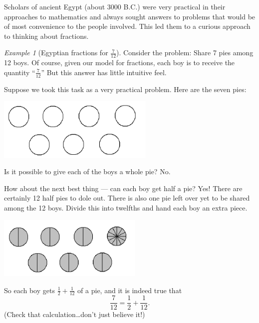 \documentclass[10pt, reqno]{amsart}
\theoremstyle{remark}
\newtheorem{example}[thm]{Example}
\theoremstyle{definition}
\numberwithin{equation}{section}  %
\begin{document}
Scholars of ancient Egypt (about 3000 B.C.) were very practical in their approaches to
mathematics and always sought answers to problems that would be of most
convenience to the people involved. This led them to a curious approach to thinking
about fractions.

\begin{example}[Egyptian fractions for $\frac 7{12}$]
Consider the problem: Share 7 pies among 12 boys.
Of course, given our model for fractions, each boy is to receive the quantity ``$\frac 7 {12}$''
But  this answer has little intuitive feel.

Suppose we took this task as a very practical problem. Here are the seven pies:
\begin{center}
\includegraphics[height=3cm]{sevenpies}
\end{center}

Is it possible to give each of the boys a whole pie? No. 

How about the next best
thing --- can  each boy get half a pie? Yes! There are certainly 12 half pies to dole out. There
is also one pie left over yet to be shared among the 12 boys. Divide this into
twelfths and hand each boy an extra piece.

\begin{center}
\includegraphics[height=3cm]{sevenpies_split}
\end{center}

So each boy gets $\frac 1 2 + \frac 1{12}$ of a pie, and it is indeed true that
\[
\frac{7}{12} = \frac 1 2 + \frac 1 {12}.
\]
(Check that calculation\dots don't just believe it!)

\end{example}
\end{document}
